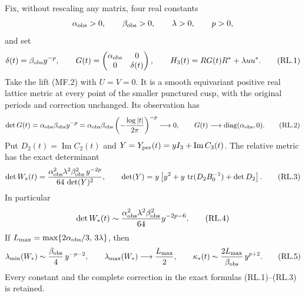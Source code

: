 \begin{proposition}
\label{q444:rank-loss-metric}
Fix, without rescaling any matrix, four real constants
\[
 \alpha_{\rm obs}>0,\qquad \beta_{\rm obs}>0,\qquad
 \lambda>0,\qquad p>0,
\]
and set
\[
 \delta(t)=\beta_{\rm obs}y^{-p},\qquad
 G(t)=\begin{pmatrix}\alpha_{\rm obs}&0\\0&\delta(t)\end{pmatrix},
 \qquad H_3(t)=RG(t)R^*+\lambda uu^*.                         \tag{RL.1}
\]
Take the lift (MF.2) with $U=V=0$.  It is a smooth equivariant positive
real lattice metric at every point of the smaller punctured cusp, with
the original periods and correction unchanged.  Its observation has
\[
 \det G(t)=\alpha_{\rm obs}\beta_{\rm obs}y^{-p}
 =\alpha_{\rm obs}\beta_{\rm obs}
       \left(-\frac{\log|t|}{2\pi}\right)^{-p}\longrightarrow0,
 \qquad
 G(t)\longrightarrow\operatorname{diag}(\alpha_{\rm obs},0).
                                                               \tag{RL.2}
\]
Put $D_2(t)=\operatorname{Im}C_2(t)$ and
$Y=Y_{\rm per}(t)=yI_3+\operatorname{Im}C_3(t)$.  The relative metric
has the exact determinant
\[
 \det W_*(t)=
 \frac{\alpha_{\rm obs}^2\lambda^2\beta_{\rm obs}^2\,y^{-2p}}
      {64\,\det(Y)^2},\qquad
 \det(Y)=y\left[
 y^2+y\,\operatorname{tr}(D_2B_0^{-1})+\det D_2\right].        \tag{RL.3}
\]
In particular
\[
 \det W_*(t)\sim
 \frac{\alpha_{\rm obs}^2\lambda^2\beta_{\rm obs}^2}{64}
 y^{-2p-6}.                                                   \tag{RL.4}
\]
If $L_{\max}=\max\{2\alpha_{\rm obs}/3,\,3\lambda\}$, then
\[
 \lambda_{\min}(W_*)\sim\frac{\beta_{\rm obs}}4\,y^{-p-2},
 \qquad
 \lambda_{\max}(W_*)\longrightarrow\frac{L_{\max}}2,
 \qquad
 \kappa_*(t)\sim\frac{2L_{\max}}{\beta_{\rm obs}}\,y^{p+2}.
                                                               \tag{RL.5}
\]
Every constant and the complete correction in the exact formulas
(RL.1)--(RL.3) is retained.
\end{proposition}

